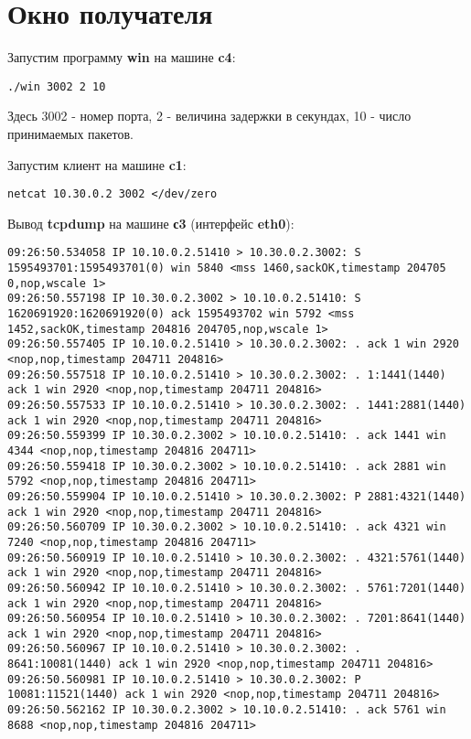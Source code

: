 \documentclass[a4paper,12pt]{article}
\begin{document}
\section{Окно получателя}

Запустим программу \textbf{win} на машине \textbf{c4}:
\begin{Verbatim}
./win 3002 2 10
\end{Verbatim}
Здесь 3002 - номер порта, 2 - величина задержки в секундах, 10 - число принимаемых
пакетов.

Запустим клиент на машине \textbf{c1}:
\begin{Verbatim}
netcat 10.30.0.2 3002 </dev/zero
\end{Verbatim}

Вывод \textbf{tcpdump} на машине \textbf{с3} (интерфейс \textbf{eth0}):
\begin{Verbatim}
09:26:50.534058 IP 10.10.0.2.51410 > 10.30.0.2.3002: S 1595493701:1595493701(0) win 5840 <mss 1460,sackOK,timestamp 204705 0,nop,wscale 1>
09:26:50.557198 IP 10.30.0.2.3002 > 10.10.0.2.51410: S 1620691920:1620691920(0) ack 1595493702 win 5792 <mss 1452,sackOK,timestamp 204816 204705,nop,wscale 1>
09:26:50.557405 IP 10.10.0.2.51410 > 10.30.0.2.3002: . ack 1 win 2920 <nop,nop,timestamp 204711 204816>
09:26:50.557518 IP 10.10.0.2.51410 > 10.30.0.2.3002: . 1:1441(1440) ack 1 win 2920 <nop,nop,timestamp 204711 204816>
09:26:50.557533 IP 10.10.0.2.51410 > 10.30.0.2.3002: . 1441:2881(1440) ack 1 win 2920 <nop,nop,timestamp 204711 204816>
09:26:50.559399 IP 10.30.0.2.3002 > 10.10.0.2.51410: . ack 1441 win 4344 <nop,nop,timestamp 204816 204711>
09:26:50.559418 IP 10.30.0.2.3002 > 10.10.0.2.51410: . ack 2881 win 5792 <nop,nop,timestamp 204816 204711>
09:26:50.559904 IP 10.10.0.2.51410 > 10.30.0.2.3002: P 2881:4321(1440) ack 1 win 2920 <nop,nop,timestamp 204711 204816>
09:26:50.560709 IP 10.30.0.2.3002 > 10.10.0.2.51410: . ack 4321 win 7240 <nop,nop,timestamp 204816 204711>
09:26:50.560919 IP 10.10.0.2.51410 > 10.30.0.2.3002: . 4321:5761(1440) ack 1 win 2920 <nop,nop,timestamp 204711 204816>
09:26:50.560942 IP 10.10.0.2.51410 > 10.30.0.2.3002: . 5761:7201(1440) ack 1 win 2920 <nop,nop,timestamp 204711 204816>
09:26:50.560954 IP 10.10.0.2.51410 > 10.30.0.2.3002: . 7201:8641(1440) ack 1 win 2920 <nop,nop,timestamp 204711 204816>
09:26:50.560967 IP 10.10.0.2.51410 > 10.30.0.2.3002: . 8641:10081(1440) ack 1 win 2920 <nop,nop,timestamp 204711 204816>
09:26:50.560981 IP 10.10.0.2.51410 > 10.30.0.2.3002: P 10081:11521(1440) ack 1 win 2920 <nop,nop,timestamp 204711 204816>
09:26:50.562162 IP 10.30.0.2.3002 > 10.10.0.2.51410: . ack 5761 win 8688 <nop,nop,timestamp 204816 204711>

\end{Verbatim}
\end{document}
